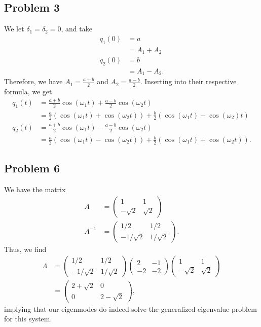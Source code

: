 \documentclass[10pt]{mypackage}
\begin{document}
\subsection{Problem 3}%
We let $\delta_1 = \delta_2 = 0$, and take
\begin{align*}
  q_1(0) &= a\\
         &= A_1 + A_2\\
  q_2(0) &= b\\
         &= A_1 - A_2.
\end{align*}
Therefore, we have $A_1 = \frac{a+b}{2}$ and $A_2 = \frac{a-b}{2}$. Inserting into their respective formula, we get
\begin{align*}
  q_1(t) &= \frac{a+b}{2}\cos\left(\omega_1t\right) + \frac{a-b}{2}\cos\left(\omega_2 t\right)\\
         &= \frac{a}{2}\left(\cos\left(\omega_1 t\right) + \cos\left(\omega_2 t\right)\right) + \frac{b}{2}\left(\cos\left(\omega_1 t\right) - \cos\left(\omega_2\right)t\right)\\
  q_2(t) &= \frac{a+b}{2}\cos\left(\omega_1t\right) - \frac{a-b}{2}\cos\left(\omega_2 t\right)\\
         &= \frac{a}{2}\left(\cos\left(\omega_1 t\right) - \cos\left(\omega_2 t\right)\right) + \frac{b}{2}\left(\cos\left(\omega_1 t\right) + \cos\left(\omega_2 t\right)\right).
\end{align*}

\subsection{Problem 6}%
We have the matrix
\begin{align*}
  A &= \begin{pmatrix}1 & 1 \\ -\sqrt{2} & \sqrt{2}\end{pmatrix}\\
  A^{-1}  &= \begin{pmatrix}1/2 & 1/2 \\ -1/\sqrt{2} & 1/\sqrt{2}\end{pmatrix}.
\end{align*}
Thus, we find
\begin{align*}
  \Lambda &= \begin{pmatrix}1/2 & 1/2 \\ -1/\sqrt{2} & 1/\sqrt{2}\end{pmatrix}\begin{pmatrix}2 & -1 \\ -2 & -2\end{pmatrix} \begin{pmatrix}1 & 1 \\ -\sqrt{2} & \sqrt{2}\end{pmatrix}\\
          &= \begin{pmatrix}2+\sqrt{2} & 0 \\ 0 & 2-\sqrt{2}\end{pmatrix},
\end{align*}
implying that our eigenmodes do indeed solve the generalized eigenvalue problem for this system.
\end{document}

